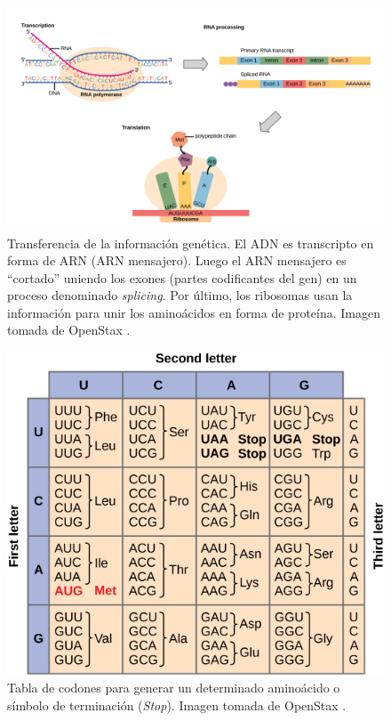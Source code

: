 \newpage

\begin{figure}[H]
\centering
    \includegraphics[scale=0.35]{documents/latex/figures/1/dogma.png}
    \caption{Transferencia de la información genética. El ADN es transcripto en forma de ARN (ARN mensajero). Luego el ARN mensajero es ``cortado'' uniendo los exones (partes codificantes del gen) en un proceso denominado \textit{splicing}. Por último, los ribosomas usan la información para unir los aminoácidos en forma de proteína. Imagen tomada de OpenStax \cite{OpenStaxCNX}.}
    \label{fig:esquema_dogma}
\end{figure}


\begin{figure}[H]
\centering
    \includegraphics[scale=0.8]{documents/latex/figures/1/tableCodon.jpg}
    \caption{Tabla de codones para generar un determinado aminoácido o símbolo de terminación (\textit{Stop}). Imagen tomada de OpenStax \cite{OpenStaxCNX}.}
    \label{fig:table_codon}
\end{figure}

